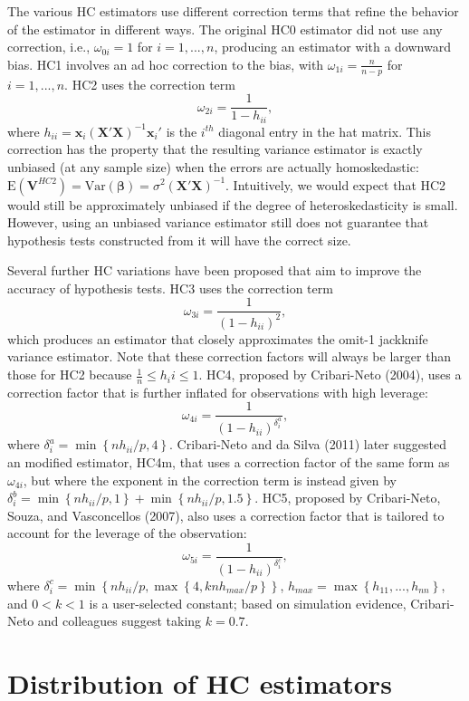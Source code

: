\documentclass{article}\usepackage[]{graphicx}\usepackage[]{color}
\newcommand{\E}{\text{E}}
\newcommand{\Var}{\text{Var}}
\newcommand{\bm}{\mathbf}
\newcommand{\bs}{\boldsymbol}
\begin{document}
The various HC estimators use different correction terms that refine the behavior of the estimator in different ways. The original HC0 estimator did not use any correction, i.e., $\omega_{0i} = 1$ for $i = 1,...,n$, producing an estimator with a downward bias. HC1 involves an ad hoc correction to the bias, with $\omega_{1i} = \frac{n}{n - p}$ for $i = 1,...,n$. HC2 uses the correction term \[
\omega_{2i} = \frac{1}{1 - h_{ii}}, \]
where $h_{ii} = \bm{x}_i \left(\bm{X}'\bm{X}\right)^{-1} \bm{x}_i'$ is the $i^{th}$ diagonal entry in the hat matrix. This correction has the property that the resulting variance estimator is exactly unbiased (at any sample size) when the errors are actually homoskedastic: $\E\left(\bm{V}^{HC2}\right) = \Var\left(\bs\beta\right) = \sigma^2\left(\bm{X}'\bm{X}\right)^{-1}$. Intuitively, we would expect that HC2 would still be approximately unbiased if the degree of heteroskedasticity is small. However, using an unbiased variance estimator still does not guarantee that hypothesis tests constructed from it will have the correct size. 

Several further HC variations have been proposed that aim to improve the accuracy of hypothesis tests. HC3 uses the correction term \[
\omega_{3i} = \frac{1}{(1 - h_{ii})^2}, \]
which produces an estimator that closely approximates the omit-1 jackknife variance estimator. Note that these correction factors will always be larger than those for HC2 because $\frac{1}{n} \leq h_ii \leq 1$. HC4, proposed by Cribari-Neto (2004), uses a correction factor that is further inflated for observations with high leverage: \[
\omega_{4i} = \frac{1}{(1 - h_{ii})^{\delta^a_i}}, \]
where $\delta^a_i = \min\left\{n h_{ii} / p, 4 \right\}$. Cribari-Neto and da Silva (2011) later suggested an modified estimator, HC4m, that uses a correction factor of the same form as $\omega_{4i}$, but where the exponent in the correction term is instead given by $\delta^b_i = \min\left\{n h_{ii} / p, 1 \right\} + \min\left\{n h_{ii} / p, 1.5 \right\}$. HC5, proposed by Cribari-Neto, Souza, and Vasconcellos (2007), also uses a correction factor that is tailored to account for the leverage of the observation: \[
\omega_{5i} = \frac{1}{(1 - h_{ii})^{\delta^c_i}}, \]
where $\delta^c_i = \min\left\{n h_{ii} / p, \max \left\{4, k n h_{max} / p\right\}\right\}$, $h_{max} = \max\left\{h_{11},...,h_{nn}\right\}$, and $0 < k < 1$ is a user-selected constant; based on simulation evidence, Cribari-Neto and colleagues suggest taking $k = 0.7$.

\section{Distribution of HC estimators}
\end{document}
